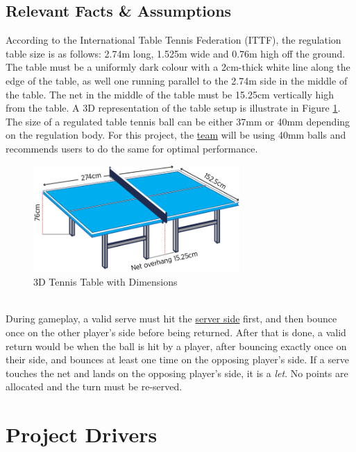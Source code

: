 \documentclass[11pt]{article}
\begin{document}
\subsection{Relevant Facts \& Assumptions}
According to the International Table Tennis Federation (ITTF), the regulation table size is as follows: 2.74m long, 1.525m wide and 0.76m high off the ground. The table must be a uniformly dark colour with a 2cm-thick white line along the edge of the table, as well one running parallel to the 2.74m side in the middle of the table. The net in the middle of the table must be 15.25cm vertically high from the table. A 3D representation of the table setup is illustrate in Figure \ref{fig:table-tennis-dim}. The size of a regulated table tennis ball can be either 37mm or 40mm depending on the regulation body. For this project, the \hyperref[sec:definitions]{team} will be using 40mm balls and recommends users to do the same for optimal performance. \\
\begin{figure}[htbp]
   \centering
   \includegraphics[width=0.7\textwidth]{img/table-tennis-dim.png} %
   \caption{3D Tennis Table with Dimensions}
   \label{fig:table-tennis-dim}
\end{figure} \\
During gameplay, a valid serve must hit the \hyperref[sec:definitions]{server side} first, and then bounce once on the other player's side before being returned. After that is done, a valid return would be when the ball is hit by a player, after bouncing exactly once on their side, and bounces at least one time on the opposing player's side. If a serve touches the net and lands on the opposing player's side, it is a \textit{let}. No points are allocated and the turn must be re-served. 


\section{Project Drivers}
\end{document}
